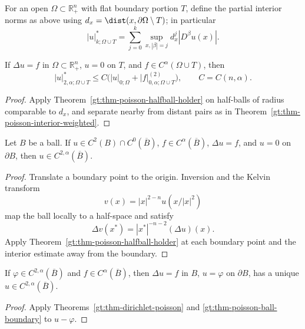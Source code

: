 For an open $\Omega\subset\mathbb R^n_+$ with flat boundary portion $T$,
define the partial interior norms as above using
$d_x=\dist(x,\partial\Omega\setminus T)$; in particular
\begin{equation}
\tag{4.29}
|u|^*_{k;\Omega\cup T}=\sum_{j=0}^k
\sup_{x,|\beta|=j}d_x^j|D^\beta u(x)|.
\end{equation}

\begin{theorem}\label{gt:thm-poisson-partial-boundary}
If $\Delta u=f$ in $\Omega\subset\mathbb R^n_+$, $u=0$ on $T$, and
$f\in C^\alpha(\Omega\cup T)$, then
\begin{equation}
\tag{4.30}
|u|^*_{2,\alpha;\Omega\cup T}
\leq C\bigl(|u|_{0;\Omega}+|f|^{(2)}_{0,\alpha;\Omega\cup T}\bigr),
\qquad C=C(n,\alpha).
\end{equation}
\end{theorem}
\begin{proof}
\sketch Apply Theorem~\ref{gt:thm-poisson-halfball-holder} on half-balls of
radius comparable to $d_x$, and separate nearby from distant pairs as in
Theorem~\ref{gt:thm-poisson-interior-weighted}.
\end{proof}

\begin{theorem}\label{gt:thm-poisson-ball-boundary}
Let $B$ be a ball. If
$u\in C^2(B)\cap C^0(\overline B)$, $f\in C^\alpha(\overline B)$,
$\Delta u=f$, and $u=0$ on $\partial B$, then
$u\in C^{2,\alpha}(\overline B)$.
\end{theorem}
\begin{proof}
\sketch Translate a boundary point to the origin. Inversion and the Kelvin
transform
\begin{equation}
\tag{4.31}
v(x)=|x|^{2-n}u(x/|x|^2)
\end{equation}
map the ball locally to a half-space and satisfy
\begin{equation}
\tag{4.32}
\Delta v(x^*)=|x^*|^{-n-2}(\Delta u)(x).
\end{equation}
Apply Theorem~\ref{gt:thm-poisson-halfball-holder} at each boundary point
and the interior estimate away from the boundary.
\end{proof}

\begin{corollary}\label{gt:cor-poisson-ball-dirichlet}
If $\varphi\in C^{2,\alpha}(\overline B)$ and
$f\in C^\alpha(\overline B)$, then $\Delta u=f$ in $B$,
$u=\varphi$ on $\partial B$, has a unique
$u\in C^{2,\alpha}(\overline B)$.
\end{corollary}
\begin{proof}
\sketch Apply Theorems~\ref{gt:thm-dirichlet-poisson} and
\ref{gt:thm-poisson-ball-boundary} to $u-\varphi$.
\end{proof}

